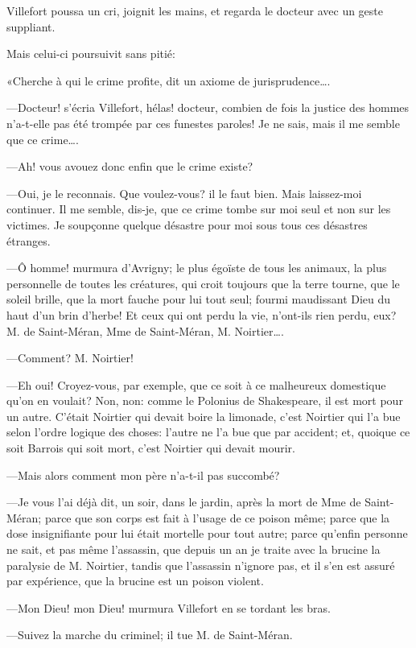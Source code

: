Villefort poussa un cri, joignit les mains, et regarda le docteur avec un geste suppliant. 

Mais celui-ci poursuivit sans pitié: 

«Cherche à qui le crime profite, dit un axiome de jurisprudence\dots. 

—Docteur! s'écria Villefort, hélas! docteur, combien de fois la justice des hommes n'a-t-elle pas été trompée par ces funestes paroles! Je ne sais, mais il me semble que ce crime\dots. 

—Ah! vous avouez donc enfin que le crime existe? 

—Oui, je le reconnais. Que voulez-vous? il le faut bien. Mais laissez-moi continuer. Il me semble, dis-je, que ce crime tombe sur moi seul et non sur les victimes. Je soupçonne quelque désastre pour moi sous tous ces désastres étranges. 

—Ô homme! murmura d'Avrigny; le plus égoïste de tous les animaux, la plus personnelle de toutes les créatures, qui croit toujours que la terre tourne, que le soleil brille, que la mort fauche pour lui tout seul; fourmi maudissant Dieu du haut d'un brin d'herbe! Et ceux qui ont perdu la vie, n'ont-ils rien perdu, eux? M. de Saint-Méran, Mme de Saint-Méran, M. Noirtier\dots. 

—Comment? M. Noirtier! 

—Eh oui! Croyez-vous, par exemple, que ce soit à ce malheureux domestique qu'on en voulait? Non, non: comme le Polonius de Shakespeare, il est mort pour un autre. C'était Noirtier qui devait boire la limonade, c'est Noirtier qui l'a bue selon l'ordre logique des choses: l'autre ne l'a bue que par accident; et, quoique ce soit Barrois qui soit mort, c'est Noirtier qui devait mourir. 

—Mais alors comment mon père n'a-t-il pas succombé? 

—Je vous l'ai déjà dit, un soir, dans le jardin, après la mort de Mme de Saint-Méran; parce que son corps est fait à l'usage de ce poison même; parce que la dose insignifiante pour lui était mortelle pour tout autre; parce qu'enfin personne ne sait, et pas même l'assassin, que depuis un an je traite avec la brucine la paralysie de M. Noirtier, tandis que l'assassin n'ignore pas, et il s'en est assuré par expérience, que la brucine est un poison violent. 

—Mon Dieu! mon Dieu! murmura Villefort en se tordant les bras. 

—Suivez la marche du criminel; il tue M. de Saint-Méran. 

